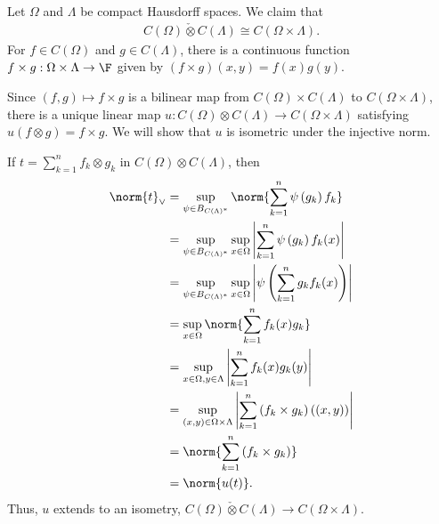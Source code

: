 \documentclass[10pt]{mypackage}
\begin{document}
\begin{example}
  Let $\Omega$ and $\Lambda$ be compact Hausdorff spaces. We claim that
  \begin{align*}
    C\left(\Omega\right)\check\otimes C\left(\Lambda\right) \cong C\left(\Omega\times\Lambda\right).
  \end{align*}
  For $f\in C\left(\Omega\right)$ and $g\in C\left(\Lambda\right)$, there is a continuous function $f\times g: \Omega\times\Lambda \rightarrow \F$ given by $\left(f\times g\right)\left(x,y\right) = f(x)g(y)$.\newline

  Since $\left(f,g\right)\mapsto f\times g $ is a bilinear map from $C\left(\Omega\right)\times C\left(\Lambda\right)$ to $C\left(\Omega\times\Lambda\right)$, there is a unique linear map $u: C\left(\Omega\right)\otimes C\left(\Lambda\right)\rightarrow C\left(\Omega\times\Lambda\right)$ satisfying $u\left(f\otimes g\right) = f\times g$. We will show that $u$ is isometric under the injective norm.\newline

  If $t = \sum_{k=1}^{n}f_k\otimes g_k$ in $C\left(\Omega\right)\otimes C\left(\Lambda\right)$, then
  \begin{align*}
    \norm{t}_{\vee} &= \sup_{\psi\in B_{C\left(\Lambda\right)^{\ast}}}\norm{\sum_{k=1}^{n}\psi\left(g_k\right)f_k}\\
                    &= \sup_{\psi\in B_{C\left(\Lambda\right)^{\ast}}} \sup_{x\in\Omega}\left\vert \sum_{k=1}^{n}\psi\left(g_k\right)f_k(x) \right\vert\\
                    &= \sup_{\psi\in B_{C\left(\Lambda\right)^{\ast}}} \sup_{x\in\Omega}\left\vert \psi\left(\sum_{k=1}^{n}g_kf_k(x) \right)\right\vert\\
                    &= \sup_{x\in\Omega}\norm{\sum_{k=1}^{n}f_k(x)g_k}\\
                    &= \sup_{x\in\Omega,y\in \Lambda}\left\vert \sum_{k=1}^{n}f_k(x)g_k(y) \right\vert\\
                    &= \sup_{\left(x,y\right)\in \Omega\times\Lambda}\left\vert \sum_{k=1}^{n}\left(f_k\times g_k\right)\left(\left(x,y\right)\right) \right\vert\\
                    &= \norm{\sum_{k=1}^{n}\left(f_k\times g_k\right)}\\
                    &= \norm{u(t)}.
  \end{align*}
  Thus, $u$ extends to an isometry, $C\left(\Omega\right)\check\otimes C\left(\Lambda\right)\rightarrow C\left(\Omega\times\Lambda\right)$.\newline


\end{example}
\end{document}
